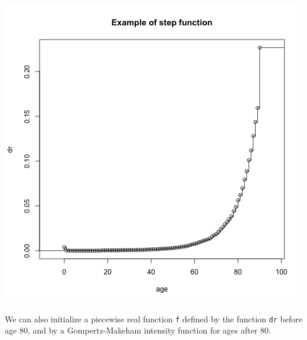 \begin{center}\includegraphics{plot_stepfun-1} \end{center}

We can also initialize a piecewise real function \texttt{f} defined by the function \texttt{dr} before age 80, and by a Gompertz-Makeham intensity function for ages after 80.

\begin{Shaded}
\begin{Highlighting}[]
\StringTok{ }\NormalTok{(}\NormalTok{, }\NormalTok{(}\NormalTok{, }\NormalTok{)))}
\StringTok{ }\NormalTok{(}\NormalTok{, }\NormalTok{)}
\NormalTok{,}\NormalTok{, }\NormalTok{)}
\end{Highlighting}
\end{Shaded}

